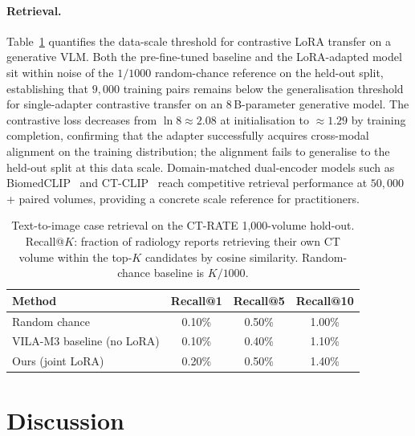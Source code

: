 \documentclass[lineno,referee,pdflatex,sn-mathphys-num]{sn-jnl}
\begin{document}
\paragraph{Retrieval.}
Table~\ref{tab:retrieval} quantifies the data-scale threshold for
contrastive LoRA transfer on a generative VLM. Both the pre-fine-tuned
baseline and the LoRA-adapted model sit within noise of the $1/1000$
random-chance reference on the held-out split, establishing that
$9{,}000$ training pairs remains below the generalisation threshold for
single-adapter contrastive transfer on an 8\,B-parameter generative model.
The contrastive loss decreases from $\ln 8 \approx 2.08$ at initialisation
to $\approx 1.29$ by training completion, confirming that the adapter
successfully acquires cross-modal alignment on the training distribution;
the alignment fails to generalise to the held-out split at this data scale.
Domain-matched dual-encoder models such as
BiomedCLIP~\cite{biomedclip2023} and CT-CLIP~\cite{ctrate2024} reach
competitive retrieval performance at $50{,}000$+ paired volumes, providing
a concrete scale reference for practitioners.

\begin{table}[!ht]
  \centering
  \caption{Text-to-image case retrieval on the CT-RATE 1{,}000-volume
    hold-out. Recall@$K$: fraction of radiology reports retrieving their
    own CT volume within the top-$K$ candidates by cosine similarity.
    Random-chance baseline is $K/1000$.}
  \label{tab:retrieval}
  \begin{tabular}{lccc}
    \toprule
    Method                     & Recall@1 & Recall@5 & Recall@10 \\
    \midrule
    Random chance              & 0.10\%   & 0.50\%   & 1.00\% \\
    VILA-M3 baseline (no LoRA) & 0.10\%   & 0.40\%   & 1.10\% \\
    Ours (joint LoRA)          & 0.20\%   & 0.50\%   & 1.40\% \\
    \bottomrule
  \end{tabular}
\end{table}


\FloatBarrier
\section{Discussion}
\label{sec:discussion}
\end{document}

